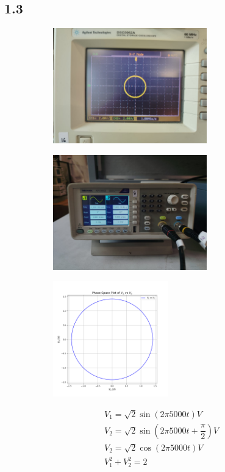\documentclass[a4paper,12pt]{article}
\begin{document}
\subsection*{1.3}
\begin{figure}[H]
    \centering
    \begin{subfigure}{0.5\textwidth}
        \centering
        \includegraphics[height=5cm]{figs/3/plot.jpeg}
    \end{subfigure}%
    \begin{subfigure}{0.5\textwidth}
        \centering
        \includegraphics[height=5cm]{figs/3/para.jpeg}
    \end{subfigure}
    \begin{subfigure}{0.5\textwidth}
        \centering
        \includegraphics[height=5cm]{figs/3/pyplot.png}
    \end{subfigure}%
\end{figure}
\begin{align}
    &V_1=\sqrt{2}\sin(2\pi 5000t) V\\
    &V_2=\sqrt{2}\sin(2\pi 5000t+\dfrac{\pi}{2}) V\\
    &V_2=\sqrt{2}\cos(2\pi 5000t) V\\
    &V_1^2+V_2^2=2
\end{align}
\end{document}
